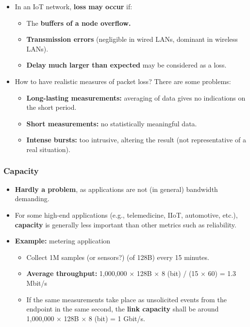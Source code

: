 \documentclass[
]{article}
\providecommand{\tightlist}{%
  \setlength{\itemsep}{0pt}\setlength{\parskip}{0pt}}
\begin{document}
\begin{itemize}
\tightlist
\item
  In an IoT network, \textbf{loss may occur} if:

  \begin{itemize}
  \tightlist
  \item
    The \textbf{buffers of a node overflow.}
  \item
    \textbf{Transmission errors} (negligible in wired LANs, dominant in
    wireless LANs).
  \item
    \textbf{Delay much larger than expected} may be considered as a
    loss.\\
  \end{itemize}
\item
  How to have realistic measures of packet loss? There are some
  problems:

  \begin{itemize}
  \tightlist
  \item
    \textbf{Long-lasting measurements:} averaging of data gives no
    indications on the short period.
  \item
    \textbf{Short measurements:} no statistically meaningful data.
  \item
    \textbf{Intense bursts:} too intrusive, altering the result (not
    representative of a real situation).
  \end{itemize}
\end{itemize}

\subsubsection{Capacity}\label{capacity}

\begin{itemize}
\tightlist
\item
  \textbf{Hardly a problem}, as applications are not (in general)
  bandwidth demanding.
\item
  For some high-end applications (e.g., telemedicine, IIoT, automotive,
  etc.), \textbf{capacity} is generally less important than other
  metrics such as reliability.
\item
  \textbf{Example:} metering application

  \begin{itemize}
  \tightlist
  \item
    Collect 1M samples (or sensors?) (of 128B) every 15 minutes.
  \item
    \textbf{Average throughput:} 1,000,000 × 128B × 8 (bit) / (15 × 60)
    = 1.3 Mbit/s
  \item
    If the same measurements take place as unsolicited events from the
    endpoint in the same second, the \textbf{link capacity} shall be
    around 1,000,000 × 128B × 8 (bit) = 1 Gbit/s.
  \end{itemize}
\end{itemize}
\end{document}
